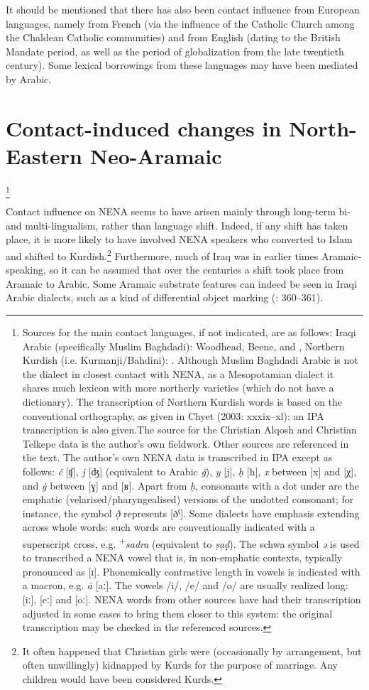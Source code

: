 \documentclass[output=paper]{langsci/langscibook}
\begin{document}
It should be mentioned that there has also been contact influence from European languages, namely from French (via the influence of the Catholic Church among the Chaldean Catholic communities) and from English (dating to the British Mandate period, as well as the period of globalization from the late twentieth century). Some lexical borrowings from these languages may have been mediated by Arabic.


\section{Contact-induced changes in North-Eastern Neo-Aramaic} \footnote{Sources for the main contact languages, if not indicated, are as follows: Iraqi Arabic (specifically Muslim Baghdadi): Woodhead, Beene, and \citet{Stowasser1967}, Northern Kurdish (i.e. Kurmanji/Bahdini): \citet{Chyet2003}. Although Muslim Baghdadi Arabic is not the dialect in closest contact with NENA, as a Mesopotamian dialect it shares much lexicon with more northerly varieties (which do not have a dictionary). The transcription of Northern Kurdish words is based on the conventional orthography, as given in Chyet (2003: xxxix–xl): an IPA transcription is also given.The source for the Christian Alqosh and Christian Telkepe data is the author’s own fieldwork. Other sources are referenced in the text. The author’s own NENA data is transcribed in IPA except as follows: \textit{č} [ʧ], \textit{j} [ʤ] (equivalent to Arabic \textit{ǧ}), \textit{y} [j], \textit{ḥ} [ħ], \textit{x} between [x] and [χ], and \textit{\.g} between [ɣ] and [ʁ]. Apart from \textit{ḥ}, consonants with a dot under are the emphatic (velarised/pharyngealised) versions of the undotted consonant; for instance, the symbol \textit{ð̣} represents [ðˁ]. Some dialects have emphasis extending across whole words: such words are conventionally indicated with a superscript cross, e.g. \textrm{\textsuperscript{+}}\textrm{\textit{sadra} }\textrm{(equivalent to} \textrm{\textit{ṣạḍ\Rạ}}). The schwa symbol \textit{ə} is used to transcribed a NENA vowel that is, in non-emphatic contexts, typically pronounced as [ɪ]. Phonemically contrastive length in vowels is indicated with a macron, e.g. \textit{ā} [aː]. The vowels /i/, /e/ and /o/ are usually realized long: [iː], [eː] and [oː]. NENA words from other sources have had their transcription adjusted in some cases to bring them closer to this system: the original transcription may be checked in the referenced sources.}

Contact influence on NENA seems to have arisen mainly through long-term bi- and multi-lingualism, rather than language shift. Indeed, if any shift has taken place, it is more likely to have involved NENA speakers who converted to Islam and shifted to Kurdish.\footnote{It often happened that Christian girls were (occasionally by arrangement, but often unwillingly) kidnapped by Kurds for the purpose of marriage. Any children would have been considered Kurds.} Furthermore, much of Iraq was in earlier times Aramaic-speaking, so it can be assumed that over the centuries a shift took place from Aramaic to Arabic. Some Aramaic substrate features can indeed be seen in Iraqi Arabic dialects, such as a kind of differential object marking (\citealt{Coghill2014}: 360–361).
\end{document}
